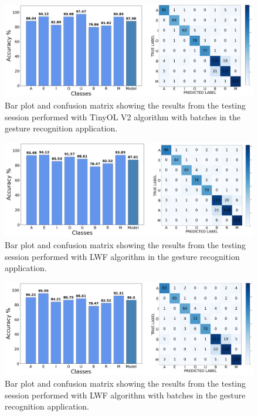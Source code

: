 \documentclass[12pt]{report}
\begin{document}
\begin{figure}[h!]
    \centering
    \includegraphics[width=140mm]{Figures/Chapter5/STM_barPlot_OL_V2_batch.png} 
    \caption{Bar plot and confusion matrix showing the results from the testing session performed with TinyOL V2 algorithm with batches in the gesture recognition application.}
    \label{fig:letter_res_OL_v2_batch}    
\end{figure}

\begin{figure}[h!]
    \centering
    \includegraphics[width=140mm]{Figures/Chapter5/STM_barPlot_LWF.png} 
    \caption{Bar plot and confusion matrix showing the results from the testing session performed with LWF algorithm in the gesture recognition application.}
    \label{fig:letter_res_LWF}    
\end{figure}

\begin{figure}[h!]
    \centering
    \includegraphics[width=140mm]{Figures/Chapter5/STM_barPlot_LWF_batch.png} 
    \caption{Bar plot and confusion matrix showing the results from the testing session performed with LWF algorithm with batches in the gesture recognition application.}
    \label{fig:letter_res_LWF_batch}    
\end{figure}
\end{document}
